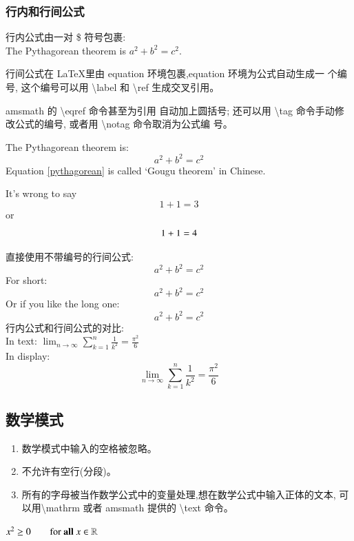 \documentclass[a4paper]{ctexart}
\begin{document}
    \subsubsection{行内和行间公式}
    行内公式由一对 \$ 符号包裹:\\
    The Pythagorean theorem is %
    $a^2 + b^2 = c^2$.\par
    行间公式在 \LaTeX 里由 equation 环境包裹,equation 环境为公式自动生成一 个编号,%
    这个编号可以用 \textbackslash label 和 \textbackslash ref 生成交叉引用。\par
    amsmath 的 \textbackslash eqref 命令甚至为引用 自动加上圆括号;%
    还可以用 \textbackslash tag 命令手动修改公式的编号,%
    或者用 \textbackslash notag 命令取消为公式编 号。\par
    The Pythagorean theorem is:
    \begin{equation}
        a^2 + b^2 = c^2 \label{pythagorean}
    \end{equation}
    Equation \eqref{pythagorean} is called `Gougu theorem' in Chinese.\par
    It's wrong to say
    \begin{equation}
        1 + 1 = 3 \tag{dumb}
    \end{equation}
    or
    \begin{equation}
        1 + 1 = 4 \notag
    \end{equation}\par
    直接使用不带编号的行间公式:
    \begin{equation*}
        a^2 + b^2 = c^2
    \end{equation*}
    For short:
    \[a^2 + b^2 = c^2\]
    Or if you like the long one:
    \begin{displaymath}
        a^2 + b^2 = c^2
    \end{displaymath}
    行内公式和行间公式的对比:\\
    In text:
    $\lim_{n \to \infty} \sum_{k=1}^n \frac{1}{k^2} = \frac{\pi^2}{6}$\\
    In display:
    \[\lim_{n \to \infty} \sum_{k=1}^n \frac{1}{k^2} = \frac{\pi^2}{6}\]
    \subsection{数学模式}
    \renewcommand{\labelenumi}{\arabic{enumi}.}
    \begin{enumerate}
        \item 数学模式中输入的空格被忽略。
        \item 不允许有空行(分段)。
        \item 所有的字母被当作数学公式中的变量处理,想在数学公式中输入正体的文本,%
              可以用\textbackslash mathrm 或者 amsmath 提供的 \textbackslash text 命令。
    \end{enumerate}
    $x^2 \geq 0  \qquad
     \text{for \textbf{all} } x \in \mathbb{R}$
\end{document}
